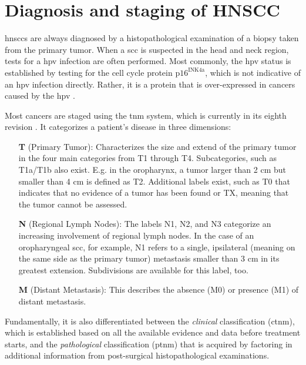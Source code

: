 \documentclass[\relativeRoot/main.tex]{subfiles}
\begin{document}
\section{Diagnosis and staging of HNSCC}
\label{sec:intro:diagnosis}

\Glspl{hnscc} are always diagnosed by a histopathological examination of a biopsy taken from the primary tumor. When a \gls{scc} is suspected in the head and neck region, tests for a \gls{hpv} infection are often performed. Most commonly, the \gls{hpv} status is established by testing for the cell cycle protein $\text{p16}^\text{INK4a}$, which is not indicative of an \gls{hpv} infection directly. Rather, it is a protein that is over-expressed in cancers caused by the \acrlong{hpv} \cite{johnson_head_2020}.

Most cancers are staged using the \gls{tnm} system, which is currently in its eighth revision \cite{brierley_tnm_2017}. It categorizes a patient's disease in three dimensions:

\begin{enumerate}
    \item[\textbf{T}] (Primary Tumor): Characterizes the size and extend of the primary tumor in the four main categories from T1 through T4. Subcategories, such as T1a/T1b also exist. E.g. in the oropharynx, a tumor larger than 2 cm but smaller than 4 cm is defined as T2. Additional labels exist, such as T0 that indicates that no evidence of a tumor has been found or TX, meaning that the tumor cannot be assessed.
    \item[\textbf{N}] (Regional Lymph Nodes): The labels N1, N2, and N3 categorize an increasing involvement of regional lymph nodes. In the case of an oropharyngeal \gls{scc}, for example, N1 refers to a single, ipsilateral (meaning on the same side as the primary tumor) metastasis smaller than 3 cm in its greatest extension. Subdivisions are available for this label, too.
    \item[\textbf{M}] (Distant Metastasis): This describes the absence (M0) or presence (M1) of distant metastasis.
\end{enumerate}

Fundamentally, it is also differentiated between the \emph{clinical} classification (c\gls{tnm}), which is established based on all the available evidence and data before treatment starts, and the \emph{pathological} classification (p\gls{tnm}) that is acquired by factoring in additional information from post-surgical histopathological examinations.
\end{document}
